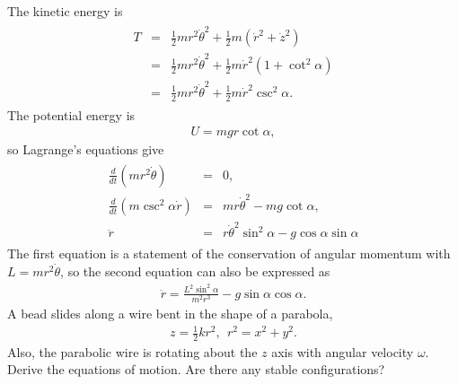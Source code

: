 \documentclass[letterpaper,10pt,english]{sphinxmanual}
\begin{document}
The kinetic energy is
\begin{equation*}
\begin{split}
\begin{eqnarray*}
T&=&\frac{1}{2}mr^2\dot{\theta}^2+\frac{1}{2}m(\dot{r}^2+\dot{z}^2)\\
&=&\frac{1}{2}mr^2\dot{\theta}^2+\frac{1}{2}m\dot{r}^2\left(1+\cot^2\alpha\right)\\
&=&\frac{1}{2}mr^2\dot{\theta}^2+\frac{1}{2}m\dot{r}^2\csc^2\alpha.
\end{eqnarray*}
\end{split}
\end{equation*}
The potential energy is
\begin{equation*}
\begin{split}
U=mgr\cot\alpha,
\end{split}
\end{equation*}
so Lagrange’s equations give
\begin{equation*}
\begin{split}
\begin{eqnarray*}
\frac{d}{dt}\left(mr^2\dot{\theta}\right)&=&0,\\
\frac{d}{dt}\left(m\csc^2\alpha \dot{r}\right)&=&mr\dot{\theta}^2-mg\cot\alpha,\\
\ddot{r}&=&r\dot{\theta}^2\sin^2\alpha-g\cos\alpha\sin\alpha
\end{eqnarray*}
\end{split}
\end{equation*}
The first equation is a statement of the conservation of angular
momentum with \(L=mr^2\dot{\theta}\), so the second equation can also be
expressed as
\begin{equation*}
\begin{split}
\ddot{r}=\frac{L^2\sin^2\alpha}{m^2r^3}-g\sin\alpha\cos\alpha.
\end{split}
\end{equation*}
A bead slides along a wire bent in the shape of a parabola,
\begin{equation*}
\begin{split}
z=\frac{1}{2}kr^2,~~r^2=x^2+y^2.
\end{split}
\end{equation*}
Also, the parabolic wire is rotating about the \(z\) axis with angular
velocity \(\omega\). Derive the equations of motion. Are there any
stable configurations?
\end{document}
